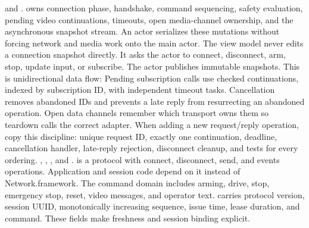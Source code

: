   and .\markdownRendererBlockQuoteEnd \markdownRendererInterblockSeparator
{} owns connection phase, handshake, command sequencing, safety evaluation, pending video continuations, timeouts, open media-channel ownership, and the asynchronous snapshot stream. An actor serializes these mutations without forcing network and media work onto the main actor.\markdownRendererParagraphSeparator
{}The view model never edits a connection snapshot directly. It asks the actor to connect, disconnect, arm, stop, update input, or subscribe. The actor publishes immutable snapshots. This is unidirectional data flow:\markdownRendererInterblockSeparator
{}\markdownRendererInterblockSeparator
{}Pending subscription calls use checked continuations, indexed by subscription ID, with independent timeout tasks. Cancellation removes abandoned IDs and prevents a late reply from resurrecting an abandoned operation. Open data channels remember which transport owns them so teardown calls the correct adapter.\markdownRendererParagraphSeparator
{}When adding a new request/reply operation, copy this discipline: unique request ID, exactly one continuation, deadline, cancellation handler, late-reply rejection, disconnect cleanup, and tests for every ordering.\markdownRendererInterblockSeparator
{}
\markdownRendererSectionEnd \markdownRendererSectionBegin
{}\markdownRendererInterblockSeparator
{}\markdownRendererBlockQuoteBegin
{} , , , and .\markdownRendererBlockQuoteEnd \markdownRendererInterblockSeparator
{} is a  protocol with connect, disconnect, send, and events operations. Application and session code depend on it instead of Network.framework.\markdownRendererParagraphSeparator
{}The command domain includes arming, drive, stop, emergency stop, reset, video messages, and operator text.  carries protocol version, session UUID, monotonically increasing sequence, issue time, lease duration, and command. These fields make freshness and session binding explicit.\markdownRendererParagraphSeparator
